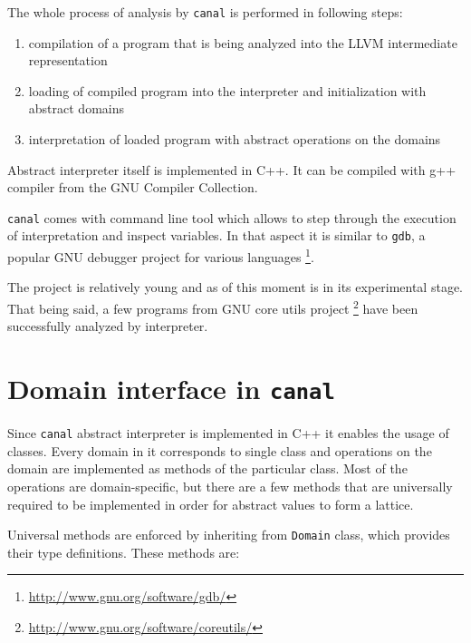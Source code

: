 \documentclass[12pt,final,oneside]{fithesis2}
\theoremstyle{definition}
\begin{document}
The whole process of analysis by \texttt{canal} is performed in following
steps:

\begin{enumerate}

\item compilation of a program that is being analyzed into the LLVM
intermediate representation

\item loading of compiled program into the interpreter and initialization
with abstract domains

\item interpretation of loaded program with abstract operations on the
domains

\end{enumerate}

Abstract interpreter itself is implemented in C++. It can be compiled with
g++ compiler from the GNU Compiler Collection.

\texttt{canal} comes with command line tool which allows to step through
the execution of interpretation and inspect variables. In that aspect it
is similar to \texttt{gdb}, a popular GNU debugger project for various
languages \footnote{\url{http://www.gnu.org/software/gdb/}}.

The project is relatively young and as of this moment is in its experimental
stage. That being said, a few programs from GNU core utils project
\footnote{\url{http://www.gnu.org/software/coreutils/}} have been
successfully analyzed by interpreter.


\section{Domain interface in \texttt{canal}}

Since \texttt{canal} abstract interpreter is implemented in C++ it enables
the usage of classes. Every domain in it corresponds to single class and
operations on the domain are implemented as methods of the particular class.
Most of the operations are domain-specific, but there are a few methods
that are universally required to be implemented in order for abstract
values to form a lattice.

Universal methods are enforced by inheriting from \texttt{Domain} class,
which provides their type definitions. These methods are:
\end{document}
